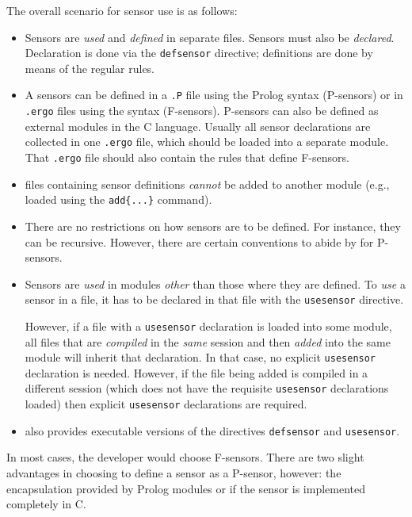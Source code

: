 \documentclass[11pt]{article}
\newcommand{\ERGO}{\mbox{\smaller{\ensuremath{\cal{E}}\smaller{{\sc{RGO}}}}}\xspace}
\newcommand{\FLSYSTEM}{\ERGO}
\newcommand{\ergoext}{ergo\xspace}
\begin{document}
The overall scenario for sensor use is as follows:
\begin{itemize}
\item  Sensors are \emph{used} and \emph{defined} in separate files.
  Sensors must also be \emph{declared}. 
  Declaration is done via the
  \texttt{defsensor} directive; definitions are done by means of the
  regular rules.
\item
  A sensors can be defined in a \texttt{.P} file
  using the Prolog syntax (P-sensors)  or in
  \texttt{.\ergoext} files using the \FLSYSTEM syntax (F-sensors). 
  P-sensors can also be defined as external modules in the C language.
  Usually all sensor declarations are collected in one \texttt{.\ergoext}
  file, which should be loaded into a separate \FLSYSTEM module. That
  \texttt{.\ergoext} file 
  should also contain the rules that define F-sensors. 
\item 
  \FLSYSTEM files containing sensor definitions \emph{cannot} be added to
  another \FLSYSTEM module (e.g., loaded 
  using the \texttt{add\{...\}} command).
\item
  There are no restrictions on how sensors are to be defined. For instance,
  they can be recursive. However, there are certain conventions to abide by
  for P-sensors.
\item  Sensors are \emph{used} in modules \emph{other} than those where they
  are defined. To \emph{use} a sensor in a file, it has to be declared
  in that file with the \texttt{usesensor} directive.

  However, if a file with a \texttt{usesensor} declaration is loaded into
  some module, all
  files that are \emph{compiled} in the \emph{same} \FLSYSTEM session  
  and then \emph{added}  into the same module will inherit that declaration.
  In that case, no explicit \texttt{usesensor} declaration is needed.
  However, if the file being added is compiled in a different \FLSYSTEM
  session (which does not have the requisite \texttt{usesensor}
  declarations loaded) then explicit \texttt{usesensor} declarations are
  required.  
\item \FLSYSTEM also provides executable versions of the directives 
  \texttt{defsensor} and \texttt{usesensor}.  
\end{itemize}

In most cases, the developer would choose F-sensors. There are two slight
advantages in choosing to define a sensor as a P-sensor, however: the encapsulation
provided by Prolog modules or if the sensor is implemented completely in C.
\end{document}

